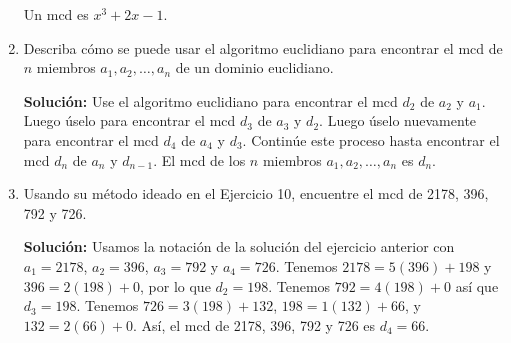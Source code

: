 \begin{enumerate}
    Un mcd es \( x^3 + 2x - 1 \).
    
    \item Describa cómo se puede usar el algoritmo euclidiano para encontrar el mcd de \( n \) miembros \( a_1, a_2, \ldots, a_n \) de un dominio euclidiano.
    
    \textbf{Solución:} Use el algoritmo euclidiano para encontrar el mcd \( d_2 \) de \( a_2 \) y \( a_1 \). Luego úselo para encontrar el mcd \( d_3 \) de \( a_3 \) y \( d_2 \). Luego úselo nuevamente para encontrar el mcd \( d_4 \) de \( a_4 \) y \( d_3 \). Continúe este proceso hasta encontrar el mcd \( d_n \) de \( a_n \) y \( d_{n-1} \). El mcd de los \( n \) miembros \( a_1, a_2, \ldots, a_n \) es \( d_n \).
    
    \item Usando su método ideado en el Ejercicio 10, encuentre el mcd de 2178, 396, 792 y 726.
    
    \textbf{Solución:} Usamos la notación de la solución del ejercicio anterior con \( a_1 = 2178 \), \( a_2 = 396 \), \( a_3 = 792 \) y \( a_4 = 726 \). Tenemos \( 2178 = 5(396) + 198 \) y \( 396 = 2(198) + 0 \), por lo que \( d_2 = 198 \). Tenemos \( 792 = 4(198) + 0 \) así que \( d_3 = 198 \). Tenemos \( 726 = 3(198) + 132 \), \( 198 = 1(132) + 66 \), y \( 132 = 2(66) + 0 \). Así, el mcd de 2178, 396, 792 y 726 es \( d_4 = 66 \).
\end{enumerate}